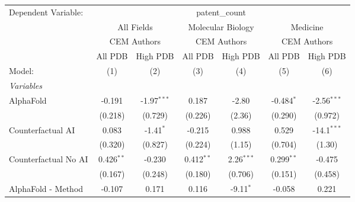 \begingroup
\centering
\begin{tabular}{lcccccc}
   \tabularnewline \midrule \midrule
   Dependent Variable: & \multicolumn{6}{c}{patent\_count}\\
 & \multicolumn{2}{c}{All Fields} & \multicolumn{2}{c}{Molecular Biology} & \multicolumn{2}{c}{Medicine} \\
\cmidrule(lr){2-3} \cmidrule(lr){4-5} \cmidrule(lr){6-7}
 & \multicolumn{2}{c}{CEM Authors} & \multicolumn{2}{c}{CEM Authors} & \multicolumn{2}{c}{CEM Authors} \\
\cmidrule(lr){2-3} \cmidrule(lr){4-5} \cmidrule(lr){6-7}
 & \multicolumn{1}{c}{All PDB} & \multicolumn{1}{c}{High PDB} & \multicolumn{1}{c}{All PDB} & \multicolumn{1}{c}{High PDB} & \multicolumn{1}{c}{All PDB} & \multicolumn{1}{c}{High PDB} \\
\cmidrule(lr){2-2} \cmidrule(lr){3-3} \cmidrule(lr){4-4} \cmidrule(lr){5-5} \cmidrule(lr){6-6} \cmidrule(lr){7-7}
   Model:                                                     & (1)          & (2)           & (3)           & (4)           & (5)          & (6)\\  
   \midrule
   \emph{Variables}\\
   AlphaFold                                                  & -0.191       & -1.97$^{***}$ & 0.187         & -2.80         & -0.484$^{*}$ & -2.56$^{***}$\\   
                                                              & (0.218)      & (0.729)       & (0.226)       & (2.36)        & (0.290)      & (0.972)\\   
   Counterfactual AI                                          & 0.083        & -1.41$^{*}$   & -0.215        & 0.988         & 0.529        & -14.1$^{***}$\\   
                                                              & (0.320)      & (0.827)       & (0.224)       & (1.15)        & (0.704)      & (1.30)\\   
   Counterfactual No AI                                       & 0.426$^{**}$ & -0.230        & 0.412$^{**}$  & 2.26$^{***}$  & 0.299$^{**}$ & -0.475\\   
                                                              & (0.167)      & (0.248)       & (0.180)       & (0.706)       & (0.151)      & (0.458)\\   
   AlphaFold - Method                                         & -0.107       & 0.171         & 0.116         & -9.11$^{*}$   & -0.058       & 0.221\\   

\end{tabular}
